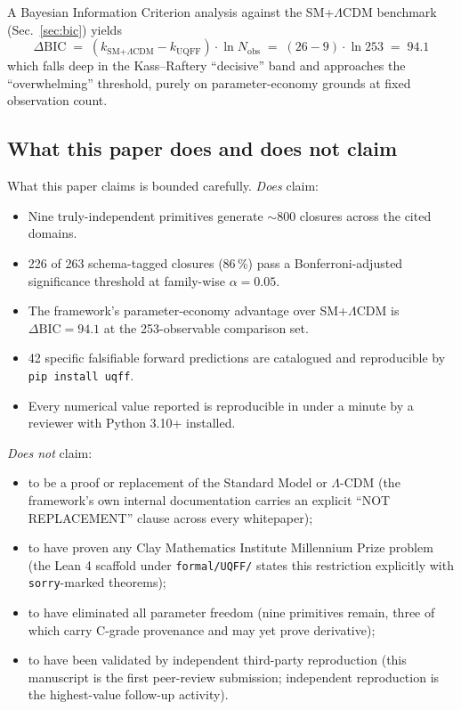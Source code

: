 A Bayesian Information Criterion analysis against the
SM+$\Lambda$CDM benchmark (Sec.~\ref{sec:bic}) yields
\begin{equation*}
\Delta\mathrm{BIC} \;=\; (k_{\text{SM+}\Lambda\text{CDM}} - k_{\text{UQFF}})\cdot\ln N_{\text{obs}}
\;=\; (26 - 9)\cdot\ln 253 \;=\; 94.1
\end{equation*}
which falls deep in the Kass--Raftery ``decisive'' band and
approaches the ``overwhelming'' threshold, purely on
parameter-economy grounds at fixed observation count.

\subsection{What this paper does and does not claim}
\label{sec:does_does_not_claim}

What this paper claims is bounded carefully. \emph{Does} claim:

\begin{itemize}
  \item Nine truly-independent primitives generate
        $\sim 800$ closures across the cited domains.
  \item 226 of 263 schema-tagged closures (86\,\%) pass a
        Bonferroni-adjusted significance threshold at
        family-wise $\alpha = 0.05$.
  \item The framework's parameter-economy advantage over
        SM+$\Lambda$CDM is $\Delta\mathrm{BIC} = 94.1$ at the
        253-observable comparison set.
  \item 42 specific falsifiable forward predictions are
        catalogued and reproducible by \texttt{pip install uqff}.
  \item Every numerical value reported is reproducible in under
        a minute by a reviewer with Python 3.10+ installed.
\end{itemize}

\emph{Does not} claim:

\begin{itemize}
  \item to be a proof or replacement of the Standard Model or
        $\Lambda$-CDM (the framework's own internal documentation
        carries an explicit ``NOT REPLACEMENT'' clause across
        every whitepaper);
  \item to have proven any Clay Mathematics Institute Millennium
        Prize problem (the Lean 4 scaffold under
        \texttt{formal/UQFF/} states this restriction explicitly
        with \texttt{sorry}-marked theorems);
  \item to have eliminated all parameter freedom (nine primitives
        remain, three of which carry C-grade provenance and may
        yet prove derivative);
  \item to have been validated by independent third-party
        reproduction (this manuscript is the first peer-review
        submission; independent reproduction is the highest-value
        follow-up activity).
\end{itemize}


